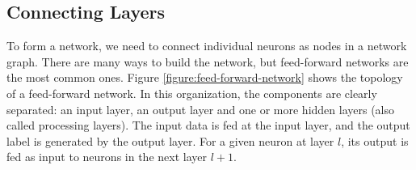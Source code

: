 \documentclass[12pt]{report}
\begin{document}
\subsection {Connecting Layers}
To form a network, we  need to connect individual neurons as nodes in a network graph. There are many ways to build the network, but feed-forward networks are the most common ones.  Figure \ref{figure:feed-forward-network}  shows the topology of a feed-forward network. In this organization, the components are clearly separated: an input layer, an output layer and one or more hidden layers (also called processing layers). The input data is fed at
the input layer, and the output label is  generated by the output layer. For a given neuron at layer $l$, its output is fed as input to neurons in the next layer $l + 1$. 

\end{document}

